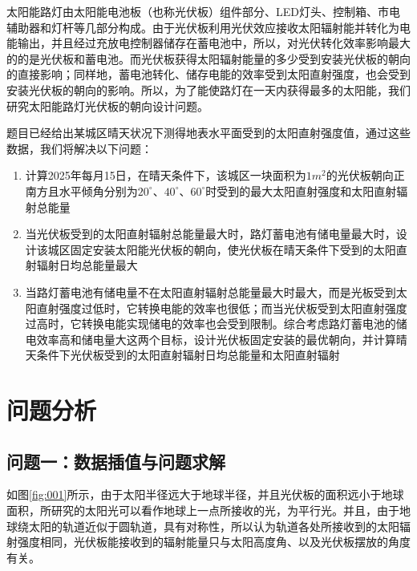 \documentclass[withoutpreface,bwprint]{cumcmthesis} %
\begin{document}
太阳能路灯由太阳能电池板（也称光伏板）组件部分、LED灯头、控制箱、市电辅助器和灯杆等几部分构成。由于光伏板利用光伏效应接收太阳辐射能并转化为电能输出，并且经过充放电控制器储存在蓄电池中，所以，对光伏转化效率影响最大的的是光伏板和蓄电池。而光伏板获得太阳辐射能量的多少受到安装光伏板的朝向的直接影响；同样地，蓄电池转化、储存电能的效率受到太阳直射强度，也会受到安装光伏板的朝向的影响。所以，为了能使路灯在一天内获得最多的太阳能，我们研究太阳能路灯光伏板的朝向设计问题。

题目已经给出某城区晴天状况下测得地表水平面受到的太阳直射强度值，通过这些数据，我们将解决以下问题：

\begin{enumerate}
	\item 计算2025年每月15日，在晴天条件下，该城区一块面积为$1m^{2}$的光伏板朝向正南方且水平倾角分别为$20^{\circ}$、$40^{\circ}$、$60^{\circ}$时受到的最大太阳直射强度和太阳直射辐射总能量
	
	
	\item 当光伏板受到的太阳直射辐射总能量最大时，路灯蓄电池有储电量最大时，设计该城区固定安装太阳能光伏板的朝向，使光伏板在晴天条件下受到的太阳直射辐射日均总能量最大
	
	
	\item 当路灯蓄电池有储电量不在太阳直射辐射总能量最大时最大，而是光板受到太阳直射强度过低时，它转换电能的效率也很低；而当光伏板受到太阳直射强度过高时，它转换电能实现储电的效率也会受到限制。综合考虑路灯蓄电池的储电效率高和储电量大这两个目标，设计光伏板固定安装的最优朝向，并计算晴天条件下光伏板受到的太阳直射辐射日均总能量和太阳直射辐射
	
\end{enumerate}



\section{问题分析}



\subsection{问题一：数据插值与问题求解}

如图\ref{fig:001}所示，由于太阳半径远大于地球半径，并且光伏板的面积远小于地球面积，所研究的太阳光可以看作地球上一点所接收的光，为平行光。并且，由于地球绕太阳的轨道近似于圆轨道，具有对称性，所以认为轨道各处所接收到的太阳辐射强度相同，光伏板能接收到的辐射能量只与太阳高度角、以及光伏板摆放的角度有关。
\end{document}
